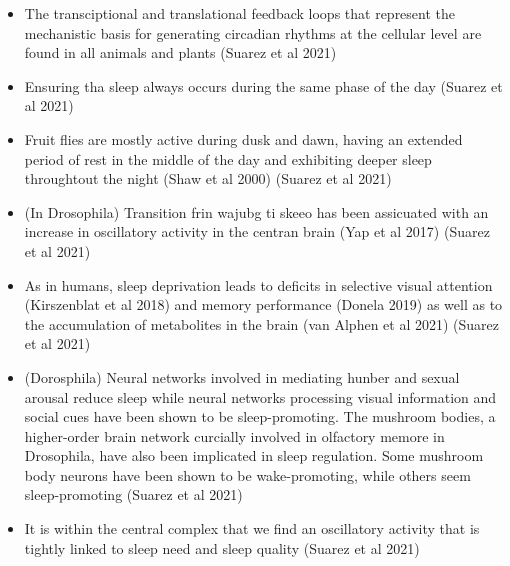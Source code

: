 \documentclass[11pt]{article}
\begin{document}
\begin{itemize}
    \item The transciptional and translational feedback loops that represent the
    mechanistic basis for generating circadian rhythms at the cellular level
    are found in all animals and plants \cite{suarez-grimaltNeuralArchitectureSleep2021}
    (Suarez et al 2021)

    \item Ensuring tha sleep always occurs during the same phase of the day \cite{suarez-grimaltNeuralArchitectureSleep2021}
    (Suarez et al 2021)

    \item Fruit flies are mostly active during dusk and dawn, having an extended period
    of rest in the middle of the day and exhibiting deeper sleep throughtout
    the night (Shaw et al 2000) \cite{suarez-grimaltNeuralArchitectureSleep2021}
    (Suarez et al 2021)

    \item (In Drosophila) Transition frin wajubg ti skeeo has been assicuated with an increase
    in oscillatory activity in the centran brain (Yap et al 2017) \cite{suarez-grimaltNeuralArchitectureSleep2021}
    (Suarez et al 2021)

    \item As in humans, sleep deprivation leads to deficits in selective visual attention (Kirszenblat et al 2018)
    and memory performance (Donela 2019) as well as to the accumulation of metabolites in the brain
    (van Alphen et al 2021) \cite{suarez-grimaltNeuralArchitectureSleep2021}
    (Suarez et al 2021)

    \item (Dorosphila) Neural networks involved in mediating hunber and sexual arousal reduce
    sleep while neural networks processing visual information and social cues have
    been shown to be sleep-promoting. The mushroom bodies, a higher-order brain
    network curcially involved in olfactory memore in Drosophila, have
    also been implicated in sleep regulation. Some mushroom body neurons have been
    shown to be wake-promoting, while others seem sleep-promoting \cite{suarez-grimaltNeuralArchitectureSleep2021}
    (Suarez et al 2021)

    \item It is within the central complex that we find an oscillatory activity that is
    tightly linked to sleep need and sleep quality \cite{suarez-grimaltNeuralArchitectureSleep2021,raccugliaNetworkSpecificSynchronizationElectrical2019}
    (Suarez et al 2021)


\end{itemize}
\end{document}
